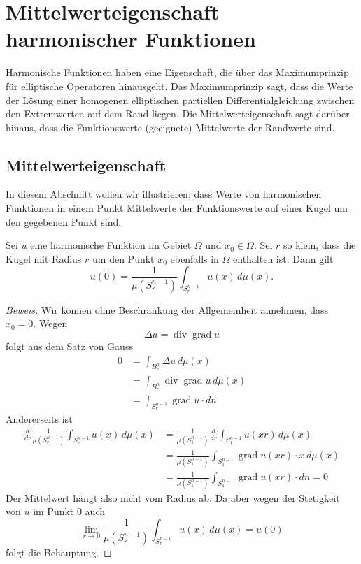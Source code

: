 %
%
%
\section{Mittelwerteigenschaft harmonischer Funktionen}
Harmonische Funktionen haben eine Eigenschaft, die über das Maximumprinzip
für elliptische Operatoren hinausgeht.
Das Maximumprinzip sagt, dass die Werte der Lösung einer homogenen
elliptischen partiellen Differentialgleichung zwischen den
Extremwerten auf dem Rand liegen.
Die Mittelwerteigenschaft sagt darüber hinaus, dass die Funktionswerte
(geeignete) Mittelwerte der Randwerte sind.

\subsection{Mittelwerteigenschaft}
In diesem Abschnitt wollen wir illustrieren, dass
Werte von harmonischen Funktionen in einem Punkt
Mittelwerte der Funktionswerte auf einer Kugel um den gegebenen Punkt sind.

\begin{satz}[Mittelwerteigenschaft]
Sei $u$ eine harmonische Funktion im Gebiet $\Omega$ und $x_0\in\Omega$.
Sei $r$ so klein, dass die Kugel mit Radius $r$ um den Punkt $x_0$
ebenfalls in $\Omega$ enthalten ist. Dann gilt
\[
u(0)=\frac1{\mu(S^{n-1}_r)}\int_{S^{n-1}_r}u(x)\,d\mu(x).
\]
\end{satz}
\begin{proof}[Beweis]
Wir können ohne Beschränkung der Allgemeinheit annehmen, dass $x_0=0$.
Wegen 
\[
\Delta u=\operatorname{div}\operatorname{grad}u
\]
folgt aus dem Satz von Gauss
\begin{align*}
0&=\int_{B_r^n}\Delta u\,d\mu(x)
\\
&=\int_{B_r^n}\operatorname{div}\operatorname{grad}u\,d\mu(x)
\\
&=\int_{S_r^{n-1}} \operatorname{grad}u\cdot dn
\end{align*}
Andererseits ist 
\begin{align*}
\frac{d}{dr}\frac{1}{\mu(S_r^{n-1})}\int_{S_r^{n-1}} u(x)\,d\mu(x)
&=
\frac1{\mu(S_1^{n-1})}\frac{d}{dr}\int_{S_1^{n-1}}u(xr)\,d\mu(x)
\\
&=
\frac1{\mu(S_1^{n-1})}\int_{S_1^{n-1}}\operatorname{grad}u(xr)\cdot x
\,d\mu(x)
\\
&=
\frac1{\mu(S_1^{n-1})}\int_{S_1^{n-1}}\operatorname{grad}u(xr)\cdot dn=0
\end{align*}
Der Mittelwert hängt also nicht vom Radius ab. Da aber wegen
der Stetigkeit von $u$ im Punkt $0$ auch
\[
\lim_{r\to 0}\frac1{\mu(S_r^{n-1})}\int_{S_r^{n-1}}u(x)\,d\mu(x)=u(0)
\]
folgt die Behauptung.
\end{proof}

